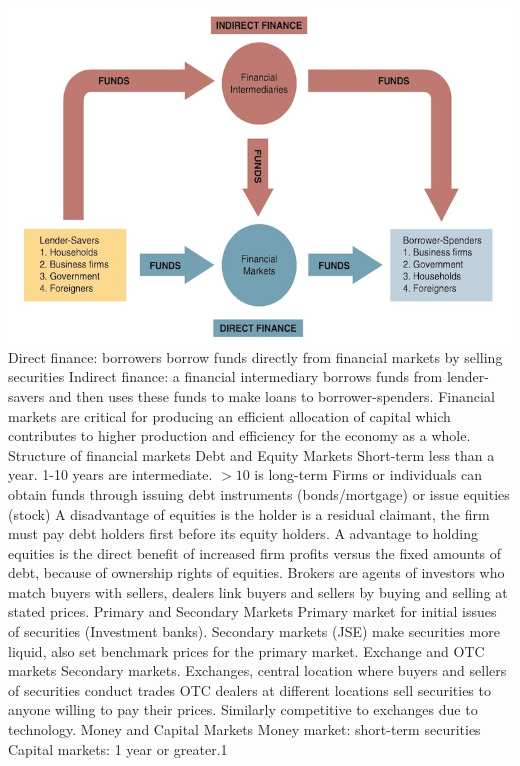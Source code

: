 \documentclass[12pt]{examnotes}
\begin{document}
\includegraphics[scale=0.5]{./imgs/2finint.jpg}
\ra Direct finance: borrowers borrow funds directly from financial markets by selling securities
\ra Indirect finance: a financial intermediary borrows funds from lender-savers and then uses these funds to make loans to borrower-spenders.
\ra Financial markets are critical for producing an efficient allocation of capital which contributes to higher production and efficiency for the economy as a whole.
\ra Structure of financial markets
 Debt and Equity Markets
\rna Short-term less than a year. 1-10 years are intermediate. $>10$ is long-term 
\rna Firms or individuals can obtain funds through issuing debt instruments (bonds/mortgage) or issue equities (stock)
\rna A disadvantage of equities is the holder is a residual claimant, the firm must pay debt holders first before its equity holders. 
\rna A advantage to holding equities is the direct benefit of increased firm profits versus the fixed amounts of debt, because of ownership rights of equities.
\ra Brokers are agents of investors who match buyers with sellers, dealers link buyers and sellers by buying and selling at stated prices. 
 Primary and Secondary Markets
\rna Primary market for initial issues of securities (Investment banks). 
\rna Secondary markets (JSE) make securities more liquid, also set benchmark prices for the primary market. 
 Exchange and OTC markets
\rna Secondary markets.
\rna Exchanges, central location where buyers and sellers of securities conduct trades
\rna OTC dealers  at different locations sell securities to anyone willing to pay their prices. Similarly competitive to exchanges due to technology.
 Money and Capital Markets
\rna Money market: short-term securities
\rna Capital markets: 1 year or greater.1
\end{document}
